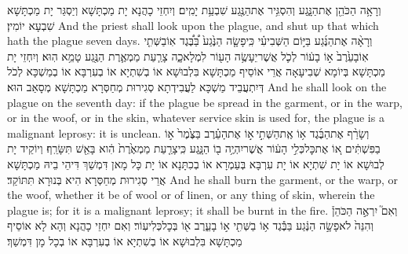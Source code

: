 {וְרָאָ֥ה הַכֹּהֵ֖ן אֶת\maqqaf הַנָּ֑גַע וְהִסְגִּ֥יר אֶת\maqqaf הַנֶּ֖גַע שִׁבְעַ֥ת יָמִֽים׃}
{וְיִחְזֵי כָהֲנָא יָת מַכְתָּשָׁא וְיַסְגַּר יָת מַכְתָּשָׁא שִׁבְעָא יוֹמִין׃}
{And the priest shall look upon the plague, and shut up that which hath the plague seven days.}{}
{וְרָאָ֨ה אֶת\maqqaf הַנֶּ֜גַע בַּיּ֣וֹם הַשְּׁבִיעִ֗י כִּֽי\maqqaf פָשָׂ֤ה הַנֶּ֙גַע֙ בַּ֠בֶּ֠גֶד אֽוֹ\maqqaf בַשְּׁתִ֤י אֽוֹ\maqqaf בָעֵ֙רֶב֙ א֣וֹ בָע֔וֹר לְכֹ֛ל אֲשֶׁר\maqqaf יֵעָשֶׂ֥ה הָע֖וֹר לִמְלָאכָ֑ה צָרַ֧עַת מַמְאֶ֛רֶת הַנֶּ֖גַע טָמֵ֥א הֽוּא׃}
{וְיִחְזֵי יָת מַכְתָּשָׁא בְּיוֹמָא שְׁבִיעָאָה אֲרֵי אוֹסֵיף מַכְתָּשָׁא בִּלְבוּשָׁא אוֹ בְשִׁתְיָא אוֹ בְעִרְבָּא אוֹ בְמַשְׁכָּא לְכֹל דְּיִתְעֲבֵיד מַשְׁכָּא לַעֲבִידְתָא סְגִירוּת מְחַסְּרָא מַכְתָּשָׁא מְסָאַב הוּא׃}
{And he shall look on the plague on the seventh day: if the plague be spread in the garment, or in the warp, or in the woof, or in the skin, whatever service skin is used for, the plague is a malignant leprosy: it is unclean.}{}
{וְשָׂרַ֨ף אֶת\maqqaf הַבֶּ֜גֶד א֥וֹ אֶֽת\maqqaf הַשְּׁתִ֣י \legarmeh  א֣וֹ אֶת\maqqaf הָעֵ֗רֶב בַּצֶּ֙מֶר֙ א֣וֹ בַפִּשְׁתִּ֔ים א֚וֹ אֶת\maqqaf כׇּל\maqqaf כְּלִ֣י הָע֔וֹר אֲשֶׁר\maqqaf יִהְיֶ֥ה ב֖וֹ הַנָּ֑גַע כִּֽי\maqqaf צָרַ֤עַת מַמְאֶ֙רֶת֙ הִ֔וא בָּאֵ֖שׁ תִּשָּׂרֵֽף׃}
{וְיוֹקֵיד יָת לְבוּשָׁא אוֹ יָת שִׁתְיָא אוֹ יָת עִרְבָּא בְּעַמְרָא אוֹ בְכִתָּנָא אוֹ יָת כָּל מָאן דִּמְשַׁךְ דִּיהֵי בֵיהּ מַכְתָּשָׁא אֲרֵי סְגִירוּת מְחַסְּרָא הִיא בְּנוּרָא תִּתּוֹקַד׃}
{And he shall burn the garment, or the warp, or the woof, whether it be of wool or of linen, or any thing of skin, wherein the plague is; for it is a malignant leprosy; it shall be burnt in the fire.}{}
{וְאִם֮ יִרְאֶ֣ה הַכֹּהֵן֒ וְהִנֵּה֙ לֹא\maqqaf פָשָׂ֣ה הַנֶּ֔גַע בַּבֶּ֕גֶד א֥וֹ בַשְּׁתִ֖י א֣וֹ בָעֵ֑רֶב א֖וֹ בְּכׇל\maqqaf כְּלִי\maqqaf עֽוֹר׃}
{וְאִם יִחְזֵי כָהֲנָא וְהָא לָא אוֹסֵיף מַכְתָּשָׁא בִּלְבוּשָׁא אוֹ בְשִׁתְיָא אוֹ בְעִרְבָּא אוֹ בְכָל מָן דִּמְשַׁךְ׃}

